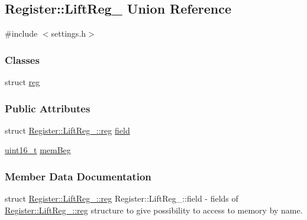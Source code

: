 \hypertarget{unionRegister_1_1LiftReg__}{}\subsection{Register\+:\+:Lift\+Reg\+\_\+ Union Reference}
\label{unionRegister_1_1LiftReg__}


{\ttfamily \#include $<$settings.\+h$>$}

\subsubsection*{Classes}
\begin{DoxyCompactItemize}
\item 
struct \mbox{\hyperlink{structRegister_1_1LiftReg___1_1reg}{reg}}
\end{DoxyCompactItemize}
\subsubsection*{Public Attributes}
\begin{DoxyCompactItemize}
\item 
struct \mbox{\hyperlink{structRegister_1_1LiftReg___1_1reg}{Register\+::\+Lift\+Reg\+\_\+\+::reg}} \mbox{\hyperlink{unionRegister_1_1LiftReg___a8f3a36072099a32a72e44be743dd09c0}{field}}
\item 
\mbox{\hyperlink{settings_8h_a017dd44e68049ffdd31500a8cd01ba68}{uint16\+\_\+t}} \mbox{\hyperlink{unionRegister_1_1LiftReg___a300648c78c7d8c50321d1c3da48ba591}{mem\+Beg}}
\end{DoxyCompactItemize}


\subsubsection{Member Data Documentation}
\mbox{\label{unionRegister_1_1LiftReg___a8f3a36072099a32a72e44be743dd09c0}} 
{\footnotesize\ttfamily struct \mbox{\hyperlink{structRegister_1_1LiftReg___1_1reg}{Register\+::\+Lift\+Reg\+\_\+\+::reg}} Register\+::\+Lift\+Reg\+\_\+\+::\texorpdfstring{field}{field}} - fields of \hyperlink{structRegister_1_1LiftReg___1_1reg}{Register\+::\+Lift\+Reg\+\_\+\+::reg} structure to give possibility to access to memory by name.

